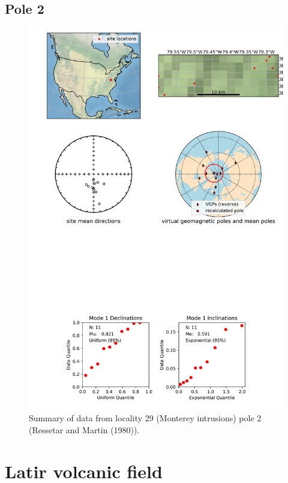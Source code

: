 \documentclass{article}
\begin{document}
\subsection{Pole 2}


\begin{figure}[H]
\centering
\includegraphics[width=5 in]{./29/2/pole_summary.png}
\caption{Summary of data from locality 29 (Monterey intrusions) pole 2 (Ressetar and Martin (1980)).}
\end{figure}

\section{Latir volcanic field}
\end{document}
